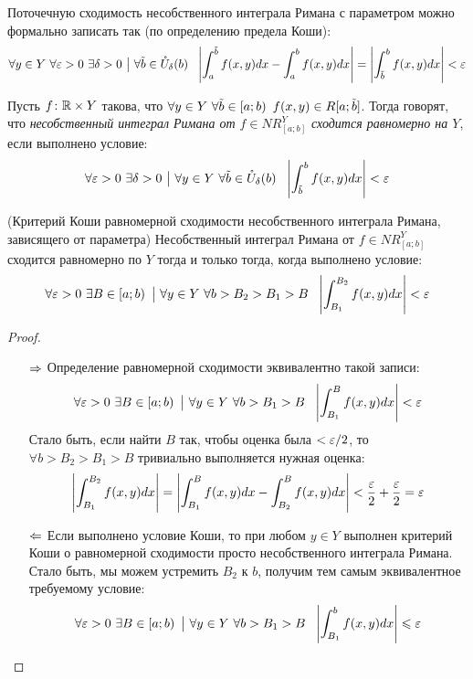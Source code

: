 \begin{note}
	Поточечную сходимость несобственного интеграла Римана с параметром можно формально записать так (по определению предела Коши):
	\[
		\forall y \in Y\ \forall \eps > 0\ \exists \delta > 0 \such \forall \tilde{b} \in \mc{U}_\delta(b)\ \ \md{\int_a^{\tilde{b}} f(x, y)dx - \int_a^b f(x, y)dx} = \md{\int_{\tilde{b}}^b f(x, y)dx} < \eps
	\]
\end{note}

\begin{definition}
	Пусть $f \colon \mathbb{R} \times Y$ такова, что $\forall y \in Y\ \forall \tilde{b} \in \left[a; b\right)\ f(x, y) \in R[a; \tilde{b}]$. Тогда говорят, что \textit{несобственный интеграл Римана от $f \in NR_{[a; b]}^Y$ сходится равномерно на $Y$}, если выполнено условие:
	\[
		\forall \varepsilon > 0\ \exists \delta > 0 \ \big|\  \forall y \in Y\ \forall \tilde{b} \in \mathring{U}_\delta(b)\ \ \left|\int_{\tilde{b}}^b f(x, y)dx\right| < \varepsilon
	\]
\end{definition}

\begin{theorem} (Критерий Коши равномерной сходимости несобственного интеграла Римана, зависящего от параметра)
	Несобственный интеграл Римана от $f \in NR_{[a; b]}^Y$ сходится равномерно по $Y$ тогда и только тогда, когда выполнено условие:
	\[
		\forall \eps > 0\ \exists B \in \lsi{a; b} \such \forall y \in Y\ \forall b > B_2 > B_1 > B\ \ \md{\int_{B_1}^{B_2} f(x, y)dx} < \eps
	\]
\end{theorem}

\begin{proof}~
	\begin{itemize}
		\item[$\Rightarrow$] Определение равномерной сходимости эквивалентно такой записи:
		\[
			\forall \varepsilon > 0\ \exists B \in \left[a; b\right) \ \big|\  \forall y \in Y\ \forall b > B_1 > B\ \ \left|\int_{B_1}^B f(x, y)dx\right| < \varepsilon
		\]
		Стало быть, если найти $B$ так, чтобы оценка была $< \varepsilon / 2$, то $\forall b > B_2 > B_1 > B$ тривиально выполняется нужная оценка:
		\[
			\left|\int_{B_1}^{B_2} f(x, y)dx\right| = \left|\int_{B_1}^B f(x, y)dx - \int_{B_2}^B f(x, y)dx\right| < \frac{\varepsilon}{2} + \frac{\varepsilon}{2} = \varepsilon
		\]
		
		\item[$\Leftarrow$] Если выполнено условие Коши, то при любом $y \in Y$ выполнен критерий Коши о равномерной сходимости просто несобственного интеграла Римана. Стало быть, мы можем устремить $B_2$ к $b$, получим тем самым эквивалентное требуемому условие:
		\[
			\forall \varepsilon > 0\ \exists B \in \left[a; b\right) \ \big|\  \forall y \in Y\ \forall b > B_1 > B\ \ \left|\int_{B_1}^b f(x, y)dx\right| \leqslant \varepsilon
		\]
	\end{itemize}
\end{proof}